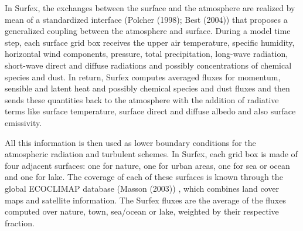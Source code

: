 

In Surfex, the exchanges between the surface and the atmosphere are realized by mean of a standardized interface (Polcher \etal (1998)\nocite{Polcher1998}; Best \etal (2004)\nocite{Best2004}) that proposes a generalized coupling between the atmosphere and surface. During a model time step, each surface grid box receives the upper air temperature, specific humidity, horizontal wind components, pressure, total precipitation, long-wave radiation, short-wave direct and diffuse radiations and possibly concentrations of chemical species and dust. In return, Surfex computes averaged fluxes for momentum, sensible and latent heat and possibly chemical species and dust fluxes and then sends these quantities back to the atmosphere with the addition of radiative terms like surface temperature, surface direct and diffuse albedo and also surface emissivity.

All this information is then used as lower boundary conditions for the atmospheric radiation and turbulent schemes. In Surfex, each grid box is made of four adjacent surfaces: one for nature, one for urban areas, one for sea or ocean and one for lake. The coverage of each of these surfaces is known through the global ECOCLIMAP database (Masson \etal (2003)\nocite{masson_2003})
, which combines land cover maps and satellite information. The Surfex fluxes are the average of the fluxes computed over nature, town, sea/ocean or lake, weighted by their respective fraction.


